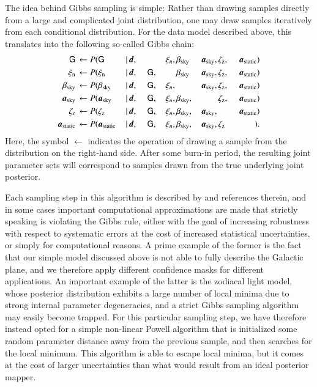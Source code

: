 \documentclass{aa}
\newcommand{\dv}[0]{\vec{d}}
\newcommand{\G}[0]{\tens{G}}
\renewcommand{\a}[0]{\vec{a}}
\begin{document}
The idea behind Gibbs sampling is simple: Rather than drawing samples
directly from a large and complicated joint distribution, one may
draw samples iteratively from each conditional distribution. For the
data model described above, this translates into the following
so-called Gibbs chain:
\begin{alignat}{11}
\G &\,\leftarrow P(\G&\,\mid &\,\dv,&\, &\,\phantom{\G} &\,\xi_n, &
\,\beta_{\mathrm{sky}}& \,\a_{\mathrm{sky}}, &\,\zeta_{\mathrm{z}},
&\,\a_{\mathrm{static}})\label{eq:gibbs_G}\\
\xi_{\mathrm{n}} &\,\leftarrow P(\xi_{\mathrm{n}}&\,\mid &\,\dv,&\, &\,\G, &\,\phantom{\xi_n} &
\,\beta_{\mathrm{sky}}& \,\a_{\mathrm{sky}}, &\,\zeta_{\mathrm{z}},
&\,\a_{\mathrm{static}})\\
\beta_{\mathrm{sky}} &\,\leftarrow P(\beta_{\mathrm{sky}}&\,\mid &\,\dv,&\, &\,\G, &\,\xi_n, &
\,\phantom{\beta_{\mathrm{sky}}}& \,\a_{\mathrm{sky}}, &\,\zeta_{\mathrm{z}}, &\,\a_{\mathrm{static}})\\
\a_{\mathrm{sky}} &\,\leftarrow P(\a_{\mathrm{sky}}&\,\mid &\,\dv,&\, &\,\G, &\,\xi_n, &
\,\beta_{\mathrm{sky}},& \,\phantom{\a_{\mathrm{sky}},}
&\,\zeta_{\mathrm{z}}, &\,\a_{\mathrm{static}})\\
\zeta_{\mathrm{z}} &\,\leftarrow P(\zeta_{\mathrm{z}}&\,\mid &\,\dv,&\, &\,\G, &\,\xi_n, &
\,\beta_{\mathrm{sky}},& \,\a_{\mathrm{sky}},
&\,\phantom{\zeta_{\mathrm{z}},} &\,\a_{\mathrm{static}})\label{eq:gibbs_zodi}\\
\a_{\mathrm{static}} &\,\leftarrow P(\a_{\mathrm{static}}&\,\mid &\,\dv,&\, &\,\G, &\,\xi_n, &
\,\beta_{\mathrm{sky}},& \,\a_{\mathrm{sky}}, &\,\zeta_{\mathrm{z}} &\,\phantom{\a_{\mathrm{static}}})\label{eq:gibbs_static}.
\end{alignat}
Here, the symbol $\leftarrow$ indicates the operation of drawing a
sample from the distribution on the right-hand side. After some
burn-in period, the resulting joint parameter sets will correspond to
samples drawn from the true underlying joint posterior.


Each sampling step in this algorithm is described by \citet{CG02_01}
and references therein, and in some cases important computational
approximations are made that strictly speaking is violating the Gibbs
rule, either with the goal of increasing robustness with respect to
systematic errors at the cost of increased statistical uncertainties,
or simply for computational reasons. A prime example of the former is
the fact that our simple model discussed above is not able to fully
describe the Galactic plane, and we therefore apply different
confidence masks for different applications. An important example of
the latter is the zodiacal light model, whose posterior distribution
exhibits a large number of local minima due to strong internal
parameter degeneracies, and a strict Gibbs sampling algorithm may
easily become trapped. For this particular sampling step, we have
therefore instead opted for a simple non-linear Powell algorithm that
is initialized some random parameter distance away from the previous
sample, and then searches for the local minimum. This algorithm is
able to escape local minima, but it comes at the cost of larger
uncertainties than what would result from an ideal posterior mapper.
\end{document}
